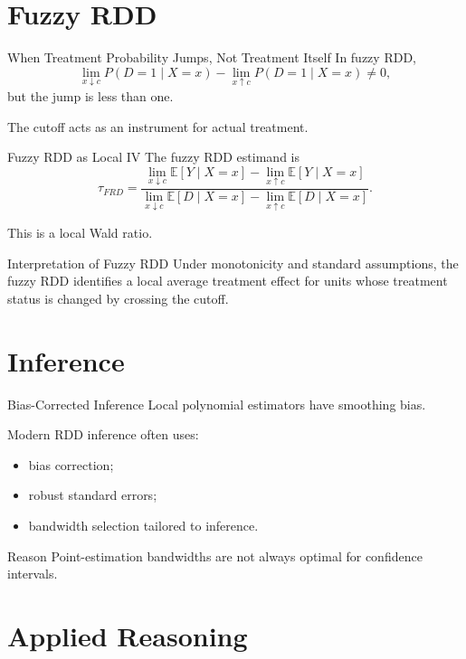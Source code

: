\documentclass[aspectratio=169,11pt]{beamer}
\newcommand{\E}{\mathbb{E}}
\begin{document}
\section{Fuzzy RDD}

\begin{frame}{When Treatment Probability Jumps, Not Treatment Itself}
In fuzzy RDD,
\[
\lim_{x\downarrow c}P(D=1\mid X=x)
-
\lim_{x\uparrow c}P(D=1\mid X=x)
\neq 0,
\]
but the jump is less than one.

The cutoff acts as an instrument for actual treatment.
\end{frame}

\begin{frame}{Fuzzy RDD as Local IV}
The fuzzy RDD estimand is
\[
\tau_{FRD}
=
\frac{
\lim_{x\downarrow c}\E[Y\mid X=x]
-
\lim_{x\uparrow c}\E[Y\mid X=x]
}{
\lim_{x\downarrow c}\E[D\mid X=x]
-
\lim_{x\uparrow c}\E[D\mid X=x]
}.
\]

This is a local Wald ratio.
\end{frame}

\begin{frame}{Interpretation of Fuzzy RDD}
Under monotonicity and standard assumptions, the fuzzy RDD identifies a local average treatment effect for units whose treatment status is changed by crossing the cutoff.
\end{frame}

\section{Inference}

\begin{frame}{Bias-Corrected Inference}
Local polynomial estimators have smoothing bias.

Modern RDD inference often uses:
\begin{itemize}
\item bias correction;
\item robust standard errors;
\item bandwidth selection tailored to inference.
\end{itemize}

\begin{block}{Reason}
Point-estimation bandwidths are not always optimal for confidence intervals.
\end{block}
\end{frame}

\section{Applied Reasoning}
\end{document}
